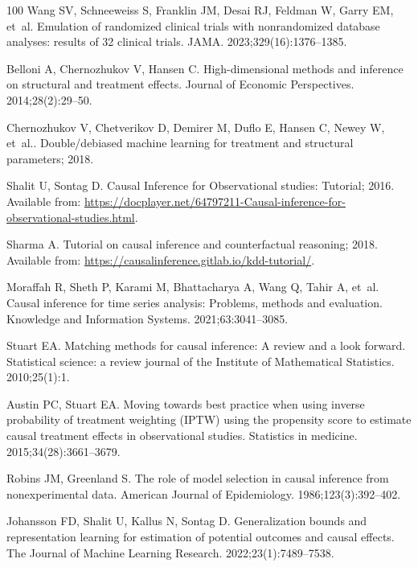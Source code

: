 \documentclass[10pt,letterpaper]{article}
\begin{document}
\begin{thebibliography}{100}
  Wang SV, Schneeweiss S, Franklin JM, Desai RJ, Feldman W, Garry EM, et~al.
  \newblock Emulation of randomized clinical trials with nonrandomized database analyses: results of 32 clinical trials.
  \newblock JAMA. 2023;329(16):1376--1385.

  Belloni A, Chernozhukov V, Hansen C.
  \newblock High-dimensional methods and inference on structural and treatment effects.
  \newblock Journal of Economic Perspectives. 2014;28(2):29--50.

  Chernozhukov V, Chetverikov D, Demirer M, Duflo E, Hansen C, Newey W, et~al.. Double/debiased machine learning for treatment and structural parameters; 2018.

  Shalit U, Sontag D. Causal Inference for Observational studies: Tutorial; 2016.
  \newblock Available from: \url{https://docplayer.net/64797211-Causal-inference-for-observational-studies.html}.

  Sharma A. Tutorial on causal inference and counterfactual reasoning; 2018.
  \newblock Available from: \url{https://causalinference.gitlab.io/kdd-tutorial/}.

  Moraffah R, Sheth P, Karami M, Bhattacharya A, Wang Q, Tahir A, et~al.
  \newblock Causal inference for time series analysis: Problems, methods and evaluation.
  \newblock Knowledge and Information Systems. 2021;63:3041--3085.

  Stuart EA.
  \newblock Matching methods for causal inference: A review and a look forward.
  \newblock Statistical science: a review journal of the Institute of Mathematical Statistics. 2010;25(1):1.

  Austin PC, Stuart EA.
  \newblock Moving towards best practice when using inverse probability of treatment weighting (IPTW) using the propensity score to estimate causal treatment effects in observational studies.
  \newblock Statistics in medicine. 2015;34(28):3661--3679.

  Robins JM, Greenland S.
  \newblock The role of model selection in causal inference from nonexperimental data.
  \newblock American Journal of Epidemiology. 1986;123(3):392--402.

  Johansson FD, Shalit U, Kallus N, Sontag D.
  \newblock Generalization bounds and representation learning for estimation of potential outcomes and causal effects.
  \newblock The Journal of Machine Learning Research. 2022;23(1):7489--7538.


\end{thebibliography}
\end{document}
